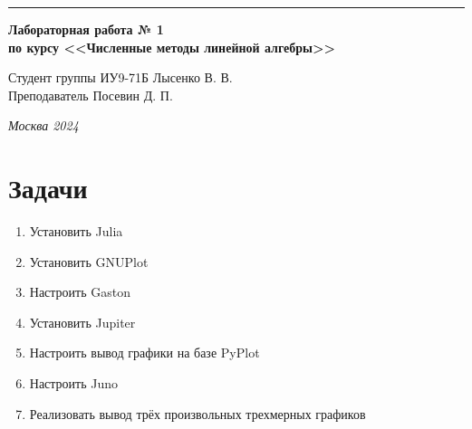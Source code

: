 \documentclass[a4paper, 14pt]{extarticle}
\begin{document}
\begin{titlepage}
\vspace*{-16pt}
\hspace{30pt}\rule{0.866\textwidth}{0.4pt}
  
\vspace{11em}

\begin{center}
\Large {\bf Лабораторная работа № 1} \\ 
\large {\bf по курсу <<Численные методы линейной алгебры>>} \\ 
\end{center}\normalsize

\vspace{8em}


\begin{flushright}
  {Студент группы ИУ9-71Б Лысенко В. В.\hspace*{15pt} \\
  \vspace{2ex}
  Преподаватель Посевин Д. П.\hspace*{15pt}}
\end{flushright}

\bigskip

\vfill
 

\begin{center}
\textsl{Москва 2024}
\end{center}
\end{titlepage}

\renewcommand{\ttdefault}{pcr}

\setlength{\tabcolsep}{3pt}
\newpage
\setcounter{page}{2}

\section{Задачи}\label{Sect::task}
\par
\renewcommand{\labelenumii}{\arabic{enumi}.\arabic{enumii}.}
\begin{enumerate} 
    \item Установить Julia
    \item Установить GNUPlot
    \item Настроить Gaston
    \item Установить Jupiter
    \item Настроить вывод графики на базе PyPlot
    \item Настроить Juno
    \item Реализовать вывод трёх произвольных трехмерных графиков
\end{enumerate}
\end{document}
